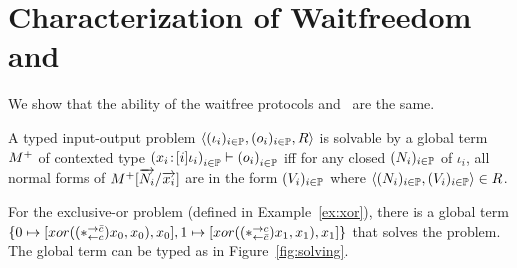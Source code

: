 \section{Characterization of Waitfreedom and \lgd}
\label{comparison}

We show that the ability of the waitfree protocols and \lgd\, are the same.
\begin{definition}
 \label{def:solvable}
 A typed input-output problem
 $\langle{(\iota_i)_{i\in \mathbb{P}}, (o_i)_{i\in \mathbb{P}}, R}\rangle$ is
 solvable by a global term
 ${M}^+$ of contexted type
 $\left({x_i} \mathord{\colon\kern -2pt}{[i]\iota_i}\right)_{i\in\mathbb{P}}
 \vdash\left(o_i\right)_{i\in \mathbb{P}}$ iff
 for any closed $(N_i)_{i\in \mathbb{P}}$ of $\iota_i$,
 all normal forms of ${M}^+[\overrightarrow{N_i}/\overrightarrow{x_i}]$
 are in the form $(V_i)_{i\in\mathbb{P}}$
 where $\langle{(N_i)_{i\in \mathbb{P}}, (V_i)_{i\in \mathbb{P}}}\rangle\in R$.
\end{definition}

 \begin{example}
  For the exclusive-or problem (defined in Example~\ref{ex:xor}), there is
  a global term $\{0\mapsto [{xor((\ast^{\rightarrow {\bar{c}}}_{\leftarrow{c}})x_0,x_0),x_0}],
  1\mapsto[{xor((\ast^{\rightarrow {c}}_{\leftarrow{\bar{c}}})x_1,x_1),x_1}]\}$ that solves the
  problem.
  The global term can be typed as in Figure~\ref{fig:solving}.
 \end{example}

